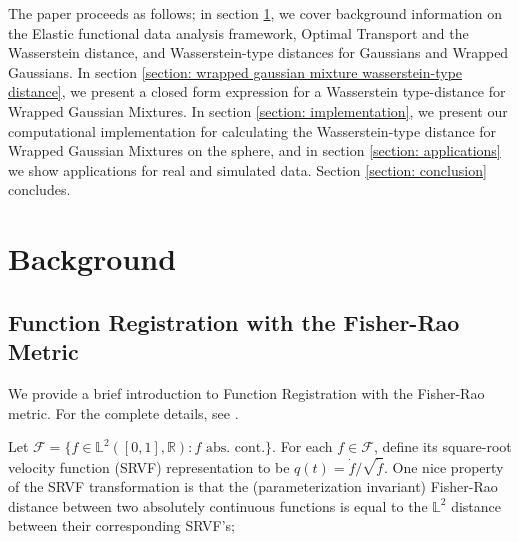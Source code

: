 \documentclass[]{article}
\begin{document}
The paper proceeds as follows; in section \ref{section: theory}, we cover background information on the Elastic functional data analysis framework, Optimal Transport and the Wasserstein distance, and Wasserstein-type distances for Gaussians and Wrapped Gaussians. In section \ref{section: wrapped gaussian mixture wasserstein-type distance}, we present a closed form expression for a Wasserstein type-distance for Wrapped Gaussian Mixtures. In section \ref{section: implementation}, we present our computational implementation for calculating the Wasserstein-type distance for Wrapped Gaussian Mixtures on the sphere, and in section \ref{section: applications} we show applications for real and simulated data. Section \ref{section: conclusion} concludes.  

\section{Background}\label{section: theory}

%
%

\subsection{Function Registration with the Fisher-Rao Metric}

We provide a brief introduction to Function Registration with the Fisher-Rao metric. For the complete details, see \cite{https://doi.org/10.48550/arxiv.1103.3817}.

Let $\mathcal{F} = \{ f \in \mathbb{L}^2([0,1], \mathbb{R}): f \text{ abs. cont.}\}$. For each $f \in \mathcal{F}$, define its square-root velocity function (SRVF) representation to be $q(t) = \dot{f}/\sqrt{\dot{f}}$. %
One nice property of the SRVF transformation is that the (parameterization invariant) Fisher-Rao distance between two absolutely continuous functions is equal to the $\mathbb{L}^2$ distance between their corresponding SRVF's;
\end{document}
